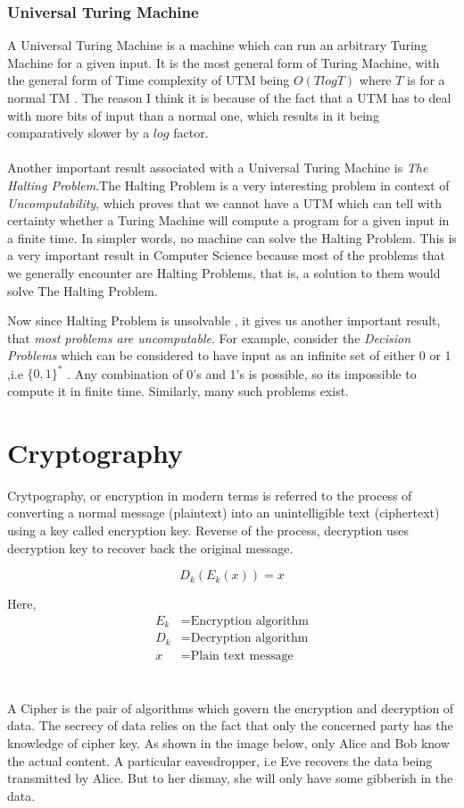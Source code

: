 \documentclass[12pt,a4paper]{extarticle}
\begin{document}
\subsubsection{Universal Turing Machine}
A Universal Turing Machine is a machine which can run an arbitrary Turing Machine for a given input. It is the most general form of Turing Machine, with the general form of Time complexity of UTM being $O(TlogT)$ where $T$ is for a normal TM . The reason I think it is because of the fact that a UTM has to deal with more bits of input than a normal one, which results in it being comparatively slower by a $log$ factor.\\\\
Another important result associated with a Universal Turing Machine is \textit{The Halting Problem}.The Halting Problem is a very interesting problem in context of \textit{Uncomputability}, which proves that we cannot have a UTM which can tell with certainty whether a Turing Machine will compute a program for a given input in a finite time. In simpler words, no machine can solve the Halting Problem. This is a very important result in Computer Science because most of the problems that we generally encounter are Halting Problems, that is, a solution to them would solve The Halting Problem.\par
Now since Halting Problem is unsolvable , it gives us another important result, that \textit{most problems are uncomputable}. For example, consider the \textit{Decision Problems} which can be considered to have input as an infinite set of either 0 or 1 ,i.e $\{0,1\}^*$ . Any combination of 0's and 1's is possible, so its impossible to compute it in finite time. Similarly, many such problems exist.\par

\section{Cryptography}
Crytpography, or encryption in modern terms is referred to the process of converting a normal message (plaintext) into an unintelligible text (ciphertext) using a key called encryption key. Reverse of the process, decryption uses decryption key to recover back the original message.

\begin{equation}
	D_k(E_k(x)) = x
\end{equation}

Here, 
\begin{align}
	E_k &=  \textrm{Encryption algorithm}  \\
	D_k &=  \textrm{Decryption algorithm}  \\
	x &=  \textrm{Plain text message}
\end{align}
\\\\
A Cipher is the pair of algorithms which govern the encryption and decryption of data. The secrecy of data relies on the fact that only the concerned party has the knowledge of cipher key. As shown in the image below, only Alice and Bob know the actual content. A particular eavesdropper, i.e Eve recovers the data being transmitted by Alice. But to her dismay, she will only have some gibberish in the data.  
\end{document}
